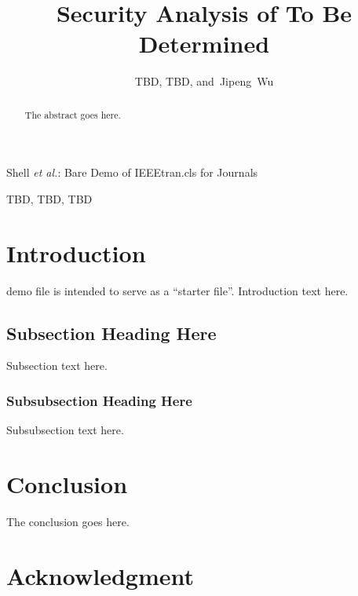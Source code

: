 \documentclass[journal]{IEEEtran}
\begin{document}
\title{Security Analysis of To Be Determined}


\author{TBD,
        TBD,
        and~Jipeng~Wu}

%
{Shell \MakeLowercase{\textit{et al.}}: Bare Demo of IEEEtran.cls for Journals}

\maketitle

\begin{abstract}
The abstract goes here.
\end{abstract}

\begin{IEEEkeywords}
TBD, TBD, TBD
\end{IEEEkeywords}


\section{Introduction}

 demo file is intended to serve as a ``starter file''. Introduction text here.

\subsection{Subsection Heading Here}
Subsection text here.


\subsubsection{Subsubsection Heading Here}
Subsubsection text here.



\section{Conclusion}
The conclusion goes here.



\section*{Acknowledgment}

\ifCLASSOPTIONcaptionsoff
  \newpage
\fi

\end{document}
